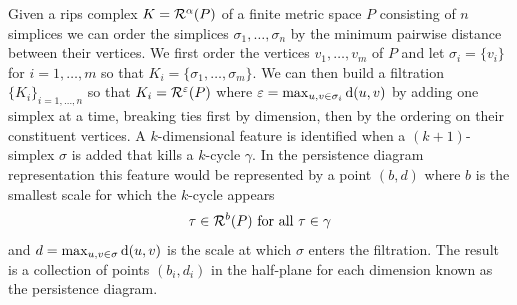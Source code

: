 Given a rips complex $K = \mathcal{R}^\alpha(P)$ of a finite metric space $P$ consisting of $n$ simplices we can order the simplices $\sigma_1,\ldots,\sigma_n$ by the minimum pairwise distance between their vertices.
We first order the vertices $v_1,\ldots,v_m$ of $P$ and let $\sigma_i = \{v_i\}$ for $i=1,\ldots,m$ so that $K_i = \{\sigma_1,\ldots, \sigma_m\}$.
We can then build a filtration $\{K_i\}_{i=1,\ldots,n}$ so that $K_i = \mathcal{R}^\varepsilon(P)$ where $\varepsilon = \max_{u,v\in\sigma_i}\mathrm{d}(u,v)$ by adding one simplex at a time, breaking ties first by dimension, then by the ordering on their constituent vertices.
A $k$-dimensional feature is identified when a $(k+1)$-simplex $\sigma$ is added that kills a $k$-cycle $\gamma$.
In the persistence diagram representation this feature would be represented by a point $(b, d)$ where $b$ is the smallest scale for which the $k$-cycle appears
\[ \tau\in\mathcal{R}^b(P)\text{ for all }\tau\in\gamma\]
and $d = \max_{u,v\in\sigma}\mathrm{d}(u,v)$ is the scale at which $\sigma$ enters the filtration.
The result is a collection of points $(b_i, d_i)$ in the half-plane for each dimension known as the persistence diagram.


